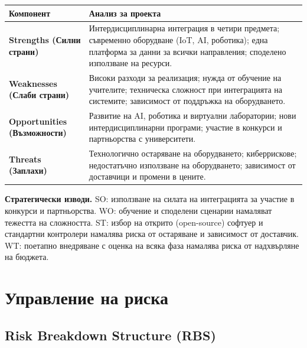 \documentclass[11pt,a4paper]{article}
\begin{document}
\begin{tabularx}{\textwidth}{@{}>{\bfseries}lX@{}}
\toprule
Компонент & Анализ за проекта \\
\midrule
Strengths (Силни страни) & Интердисциплинарна интеграция в четири предмета; съвременно оборудване (IoT, AI, роботика); една платформа за данни за всички направления; споделено използване на ресурси. \\
Weaknesses (Слаби страни) & Високи разходи за реализация; нужда от обучение на учителите; техническа сложност при интеграцията на системите; зависимост от поддръжка на оборудването. \\
Opportunities (Възможности) & Развитие на AI, роботика и виртуални лаборатории; нови интердисциплинарни програми; участие в конкурси и партньорства с университети. \\
Threats (Заплахи) & Технологично остаряване на оборудването; киберрискове; недостатъчно използване на оборудването; зависимост от доставчици и промени в цените. \\
\bottomrule
\end{tabularx}

\textbf{Стратегически изводи.} SO: използване на силата на интеграцията за участие в конкурси и партньорства. WO: обучение и споделени сценарии намаляват тежестта на сложността. ST: избор на открито (open-source) софтуер и стандартни контролери намалява риска от остаряване и зависимост от доставчик. WT: поетапно внедряване с оценка на всяка фаза намалява риска от надхвърляне на бюджета.

\section{Управление на риска}

\subsection{Risk Breakdown Structure (RBS)}
\end{document}
